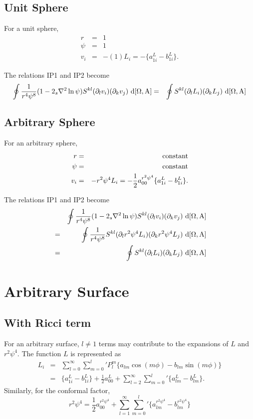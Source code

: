 \documentclass[11pt]{article}
\begin{document}
\subsection{Unit Sphere}
For a unit sphere,
\begin{eqnarray}
r &=& 1 \\
\psi &=& 1 \\
v_i &=& -(1) L_{i} =   -\{ a_{1i}^{L}-b_{1i}^{L} \} .
\end{eqnarray}

\noindent
The relations IP1 and IP2 become
\begin{eqnarray}
\oint \frac{1}{r^4 \psi^8}(1-2{_s}\nabla^2 \ln \psi) S^{kl} (\partial_l v_{i})(\partial_k v_{j}) {~\rm d [\Omega,A]}
&=& \oint S^{kl} (\partial_l L_i)(\partial_k L_j) {~\rm d [\Omega,A]}
\end{eqnarray}



\subsection{Arbitrary Sphere}
For an arbitrary sphere,
\begin{eqnarray}
r &=& {\rm constant} \\
\psi &=& {\rm constant} \\
v_i &=& -r^2 \psi^4 L_i = -\frac{1}{2} a_{00}^{r^2 \psi^4} \{ a_{1i}^{L}-b_{1i}^{L} \}.
\end{eqnarray}

\noindent
The relations IP1 and IP2 become
\begin{eqnarray} \nonumber
&&\oint \frac{1}{r^4 \psi^8}(1-2{_s}\nabla^2 \ln \psi) S^{kl} (\partial_l v_{i})(\partial_k v_{j}) {~\rm d [\Omega,A]} \\
&=& \oint \frac{1}{r^4 \psi^8} S^{kl} (\partial_l r^2 \psi^4 L_{i})(\partial_k r^2 \psi^4 L_{j}) {~\rm d [\Omega,A]} \\
&=& \oint S^{kl} (\partial_l  L_{i})(\partial_k  L_{j}) {~\rm d [\Omega,A]}
\end{eqnarray}


\section{Arbitrary Surface}
\subsection{With Ricci term}
For an arbitrary surface, $l \ne 1$ terms may contribute to the expansions of $L$ and $r^2 \psi^4$.  The function $L$ is represented as
\begin{eqnarray}
L_i  &=& \sum_{l=0}^{\infty}{\sum_{m=0}^l}' P_l^m \{ a_{lm} \cos(m\phi) - b_{lm}\sin(m\phi)\} \\
&=& \{ a_{1i}^{L}-b_{1i}^{L}  \} + \frac{1}{2} a_{00}^{L} + \sum_{l=2}^{\infty}{\sum_{m=0}^l}' \{ a_{lm}^{L}-b_{lm}^{L}  \}.
\end{eqnarray}
Similarly, for the conformal factor,
\begin{equation}
r^2 \psi^4 = \frac{1}{2} a_{00}^{r^2 \psi^4} + \sum_{l=1}^{\infty}{\sum_{m=0}^l}' \{ a_{lm}^{r^2 \psi^4}-b_{lm}^{r^2 \psi^4}  \} 
\end{equation}
\end{document}
